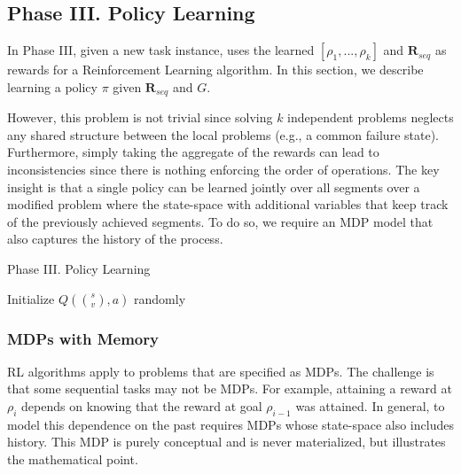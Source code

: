 \subsection*{Phase III. Policy Learning}
In Phase III, given a new task instance, \hirl uses the learned $[\rho_1,...,\rho_k]$ and $\mathbf{R}_{seq}$ as rewards for a Reinforcement Learning algorithm.
In this section, we describe learning a policy $\pi$ given $\mathbf{R}_{seq}$ and $G$.

However, this problem is not trivial since solving $k$ independent problems neglects any shared structure between the local problems (e.g., a common failure state).
Furthermore, simply taking the aggregate of the rewards can lead to inconsistencies since there is nothing enforcing the order of operations.
The key insight is that a single policy can be learned jointly over all segments over a modified problem where the state-space with additional variables that keep track of the previously achieved segments.
To do so, we require an MDP model that also captures the history of the process.


\begin{phase}[t]
\small
\DontPrintSemicolon
\caption{Phase III. Policy Learning \label{alg:tsh3}}

Initialize $Q(\binom{s}{v},a)$ randomly


\end{phase}

\vspace{-15pt}
\subsubsection{MDPs with Memory}
RL algorithms apply to problems that are specified as MDPs.
The challenge is that some sequential tasks may not be MDPs.
For example, attaining a reward at $\rho_i$ depends on knowing that the reward at goal $\rho_{i-1}$ was attained.
In general, to model this dependence on the past requires MDPs whose state-space also includes history.
This MDP is purely conceptual and is never materialized, but illustrates the mathematical point.

